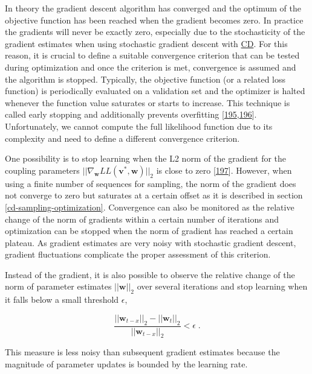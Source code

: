 \documentclass[11pt,a4paper,twoside]{book}
\renewcommand{\v}{\mathbf{v}}
\newcommand{\w}{\mathbf{w}}
\theoremstyle{definition}
\theoremstyle{definition}
\theoremstyle{remark}
\begin{document}
In theory the gradient descent algorithm has converged and the optimum
of the objective function has been reached when the gradient becomes
zero. In practice the gradients will never be exactly zero, especially
due to the stochasticity of the gradient estimates when using stochastic
gradient descent with \protect\hyperlink{abbrev}{CD}. For this reason,
it is crucial to define a suitable convergence criterion that can be
tested during optimization and once the criterion is met, convergence is
assumed and the algorithm is stopped. Typically, the objective function
(or a related loss function) is periodically evaluated on a validation
set and the optimizer is halted whenever the function value saturates or
starts to increase. This technique is called early stopping and
additionally prevents overfitting
{[}\protect\hyperlink{ref-Bengio2012}{195},\protect\hyperlink{ref-Mahsereci2017}{196}{]}.
Unfortunately, we cannot compute the full likelihood function due to its
complexity and need to define a different convergence criterion.

One possibility is to stop learning when the L2 norm of the gradient for
the coupling parameters \(||\nabla_{\w} L\!L(\v^*, \w)||_2\) is close to
zero {[}\protect\hyperlink{ref-Carreira-Perpinan2005}{197}{]}. However,
when using a finite number of sequences for sampling, the norm of the
gradient does not converge to zero but saturates at a certain offset as
it is described in section \ref{cd-sampling-optimization}. Convergence
can also be monitored as the relative change of the norm of gradients
within a certain number of iterations and optimization can be stopped
when the norm of gradient has reached a certain plateau. As gradient
estimates are very noisy with stochastic gradient descent, gradient
fluctuations complicate the proper assessment of this criterion.

Instead of the gradient, it is also possible to observe the relative
change of the norm of parameter estimates \(||\w||_2\) over several
iterations and stop learning when it falls below a small threshold
\(\epsilon\),

\begin{equation}
  \frac{||\w_{t-x}||_2 - ||\w_t||_2}{||\w_{t-x}||_2} < \epsilon \; .
  \label{eq:parameter-convergence-criterion}
\end{equation}

This measure is less noisy than subsequent gradient estimates because
the magnitude of parameter updates is bounded by the learning rate.
\end{document}
